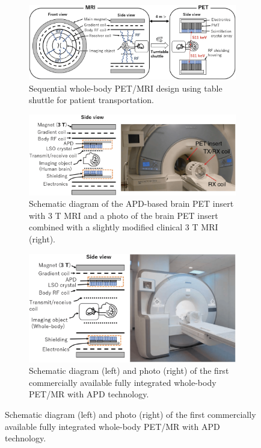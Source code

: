 \begin{multicols}{2}
\begin{figure}[H]
	\centering
	\begin{subfigure}[b]{0.45\textwidth}
		\centering
		\includegraphics[width=\textwidth]{assets/sequencial.png}
		\caption{Sequential whole-body PET/MRI design using table shuttle for patient transportation.}
		\label{fig:sequential}
	\end{subfigure}
	\begin{subfigure}[b]{0.45\textwidth}
		\centering
		\includegraphics[width=\textwidth]{assets/insert.png}
		\caption{Schematic diagram of the APD-based brain PET insert with 3 T MRI and a photo of the brain PET insert combined with a slightly modified clinical 3 T MRI (right).}
		\label{fig:insert}
	\end{subfigure}
	
	\begin{subfigure}[b]{0.45\textwidth}
		\centering
		\includegraphics[width=\textwidth]{assets/integrated.png}
		\caption{Schematic diagram (left) and photo (right) of the first commercially available fully integrated whole-body PET/MR with APD technology.}
		\label{fig:integrated}
	\end{subfigure}
	

\end{figure}
\end{multicols}
